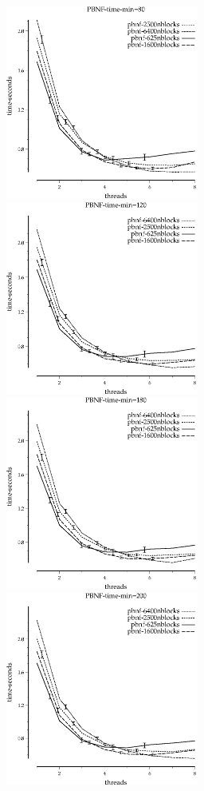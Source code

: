 \documentclass{article}
\begin{document}
\begin{figure}
\begin{center}
\includegraphics[width=2.5in]{PBNF-time-min=80}
\includegraphics[width=2.5in]{PBNF-time-min=120}
\includegraphics[width=2.5in]{PBNF-time-min=180}
\includegraphics[width=2.5in]{PBNF-time-min=200}

\end{center}
\end{figure}
\end{document}

